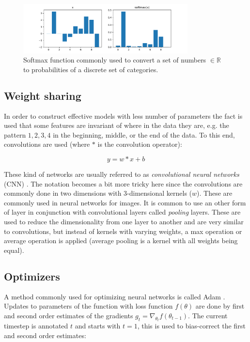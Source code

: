 \begin{figure}[h]
    \centering
    \includegraphics[width=0.8\textwidth]{res/softmax.pdf}

    \caption{Softmax function commonly used to convert a set of numbers $\in
    \mathbb{R}$ to probabilities of a discrete set of categories.}

    \label{fig:softmax}
\end{figure}

\subsection{Weight sharing}

In order to construct effective models with less number of parameters the fact
is used that some features are invariant of where in the data they are, e.g.
the pattern $1, 2, 3, 4$ in the beginning, middle, or the end of the data. To
this end, convolutions are used (where $*$ is the convolution operator):

\begin{equation}
    y = w * x + b
\end{equation}

These kind of networks are usually referred to as \textit{convolutional neural
networks} (CNN) \cite{lecun1989backpropagation}. The notation becomes a bit
more tricky here since the convolutions are commonly done in two dimensions
with 3-dimensional kernels ($w$). These are commonly used in neural networks
for images. It is common to use an other form of layer in conjunction with
convolutional layers called \textit{pooling} layers. These are used to reduce
the dimensionality from one layer to another and are very similar to
convolutions, but instead of kernels with varying weights, a max operation
\cite{huang2007unsupervised} or average operation \cite{lecun1998gradient} is
applied (average pooling is a kernel with all weights being equal).

\subsection{Optimizers}

A method commonly used for optimizing neural networks is called Adam
\cite{kingma2014adam}. Updates to parameters of the function with loss function
$f(\theta)$ are done by first and second order estimates of the gradients $g_t
= \nabla_{\theta_t} f(\theta_{t-1})$. The current timestep is annotated $t$ and
starts with $t = 1$, this is used to bias-correct the first and second order
estimates:

